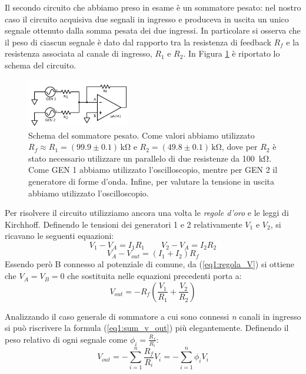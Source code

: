 Il secondo circuito che abbiamo preso in esame è un sommatore pesato: nel nostro caso il circuito acquisiva due segnali in ingresso e produceva in uscita un unico segnale ottenuto dalla somma pesata dei due ingressi. In particolare si osserva che il peso di ciascun segnale è dato dal rapporto tra la resistenza di feedback $R_f$ e la resistenza associata al canale di ingresso, $R_1$ e $R_2$. In Figura \ref{cir1:sommatore_pesato} è riportato lo schema del circuito.

\begin{figure}
  \begin{center}
    \includegraphics[width=0.40\textwidth]{../E01/latex/c2.pdf}
  \end{center}
  \caption{Schema del sommatore pesato. Come valori abbiamo utilizzato $R_f \approx R_1=(99.9 \pm 0.1)\,\si{\kilo\ohm}$ e $R_2=(49.8 \pm 0.1)\,\si{\kilo\ohm}$, dove per $R_2$ è stato necessario utilizzare un parallelo di due resistenze da \SI{100}{\kilo\ohm}. Come GEN 1 abbiamo utilizzato l'oscilloscopio, mentre per GEN 2 il generatore di forme d'onda. Infine, per valutare la tensione in uscita abbiamo utilizzato l'oscilloscopio.}
\label{cir1:sommatore_pesato}
\end{figure}

Per risolvere il circuito utilizziamo ancora una volta le \textit{regole d'oro} e le leggi di Kirchhoff. Definendo le tensioni dei generatori 1 e 2 relativamente $V_1$ e $V_2$, si ricavano le seguenti equazioni:
$$V_1 - V_A =I_1 R_1 \qquad V_2 - V_A =I_2 R_2$$
$$V_A - V_{out} =(I_1+I_2) R_f$$
Essendo però B connesso al potenziale di comune, da (\ref{eq1:regola_V}) si ottiene che $V_A = V_B = 0$ che sostituita nelle equazioni precedenti porta a:
\begin{equation}
V_{out}=-R_f \left( \frac{V_1}{R_1}+\frac{V_2}{R_2}\right)
\label{eq1:sum_v_out}
\end{equation}

Analizzando il caso generale di sommatore a cui sono connessi \textit{n} canali in ingresso si può riscrivere la formula (\ref{eq1:sum_v_out}) più elegantemente. Definendo il peso relativo di ogni segnale come $\phi_i = \frac{R_f}{R_i}$:
\begin{equation*}
V_{out}=-\sum^{n}_{i=1} \frac{R_f}{R_{i}}V_{i}=-\sum^{n}_{i=1} \phi_i V_{i}
\end{equation*}


